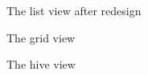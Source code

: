 \begin{figure}[ht]
\centering
\caption{The list view after redesign}
\label{fig:final_list}
\end{figure}

\begin{figure}[ht]
\centering
\caption{The grid view}
\label{fig:grid}
\end{figure}

\begin{figure}[ht]
\centering
\caption{The hive view}
\label{fig:hive}
\end{figure}

